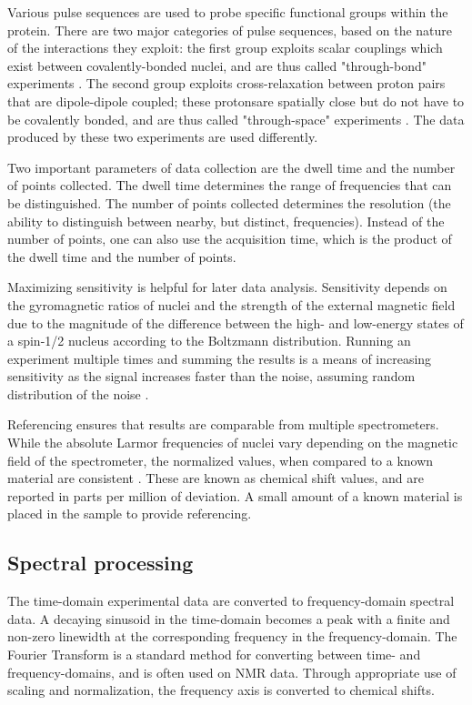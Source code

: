 Various pulse sequences are used to probe specific functional groups within
the protein.  There are two major categories of pulse sequences, based on the
nature of the interactions they exploit: the first group exploits scalar 
couplings which exist between covalently-bonded nuclei, and are thus called 
"through-bond" experiments \cite{davis1985assignment}.  
The second group exploits cross-relaxation between proton pairs that are
dipole-dipole coupled; these protonsare spatially close but do not have to 
be covalently bonded, and are thus called "through-space" experiments
\cite{solomon1955relaxation}.  The data produced by these two experiments are 
used differently.

Two important parameters of data collection are the dwell time and the number
of points collected.  The dwell time determines the range of frequencies that
can be distinguished.  The number of points collected determines the resolution
(the ability to distinguish between nearby, but distinct, frequencies).  Instead
of the number of points, one can also use the acquisition time, which is the
product of the dwell time and the number of points.

Maximizing sensitivity is helpful for later data analysis.
Sensitivity depends on the gyromagnetic ratios of nuclei and 
the strength of the external magnetic field due to the magnitude of the
difference between the high- and low-energy states of a spin-1/2 nucleus
according to the Boltzmann distribution.
Running an experiment multiple times and summing the results is a 
means of increasing sensitivity as the signal increases faster
than the noise, assuming random distribution of the noise
\cite{ardenkjaer2003increase}.

Referencing ensures that results are comparable from multiple
spectrometers.  While the absolute Larmor frequencies of nuclei vary depending
on the magnetic field of the spectrometer, the normalized values, when compared
to a known material are consistent \cite{wishart19951h}.  
These are known as chemical shift values, and are reported in parts per 
million of deviation.  A small amount of a known material is placed in the 
sample to provide referencing.

\subsection*{Spectral processing}

The time-domain experimental data are converted to frequency-domain spectral
data.  A decaying sinusoid in the time-domain becomes
a peak with a finite and non-zero linewidth at the corresponding frequency
in the frequency-domain.  The Fourier Transform \cite{cooley1965algorithm}
is a standard method for 
converting between time- and frequency-domains, and is often used on NMR data.
Through appropriate use of scaling and normalization, the frequency axis is
converted to chemical shifts.

